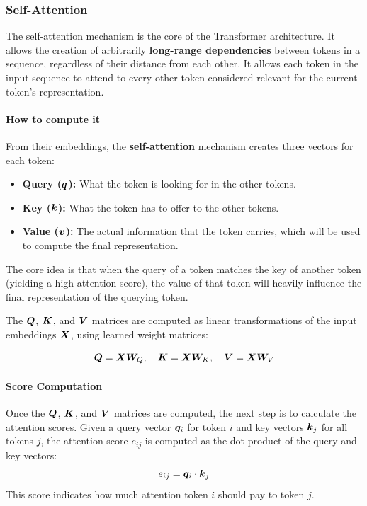 \subsubsection{Self-Attention}
The self-attention mechanism is the core of the Transformer architecture.
It allows the creation of arbitrarily \textbf{long-range dependencies} between tokens in a sequence, regardless of their distance from each other.
It allows each token in the input sequence to attend to every other token considered relevant for the current token's representation.

\paragraph{How to compute it}
From their embeddings, the \textbf{self-attention} mechanism creates three vectors for each token:
\begin{itemize}
    \item \textbf{Query (\(\boldsymbol{q}\)):} What the token is looking for in the other tokens.
    \item \textbf{Key (\(\boldsymbol{k}\)):} What the token has to offer to the other tokens.
    \item \textbf{Value (\(\boldsymbol{v}\)):} The actual information that the token carries, which will be used to compute the final representation.
\end{itemize}

The core idea is that when the query of a token matches the key of another token (yielding a high attention score), the value of that token will heavily influence the final representation of the querying token.

The \(\boldsymbol{Q}\), \(\boldsymbol{K}\), and \(\boldsymbol{V}\) matrices are computed as linear transformations of the input embeddings \(\boldsymbol{X}\), using learned weight matrices:

\[
    \boldsymbol{Q} = \boldsymbol{X} \boldsymbol{W}_Q, \quad
    \boldsymbol{K} = \boldsymbol{X} \boldsymbol{W}_K, \quad
    \boldsymbol{V} = \boldsymbol{X} \boldsymbol{W}_V
\]

\paragraph{Score Computation}
Once the \(\boldsymbol{Q}\), \(\boldsymbol{K}\), and \(\boldsymbol{V}\) matrices are computed, the next step is to calculate the attention scores.
Given a query vector \(\boldsymbol{q}_i\) for token \(i\) and key vectors \(\boldsymbol{k}_j\) for all tokens \(j\), the attention score \(e_{ij}\) is computed as the dot product of the query and key vectors:
\[
e_{ij} = \boldsymbol{q}_i \cdot \boldsymbol{k}_j
\]
This score indicates how much attention token \(i\) should pay to token \(j\).

